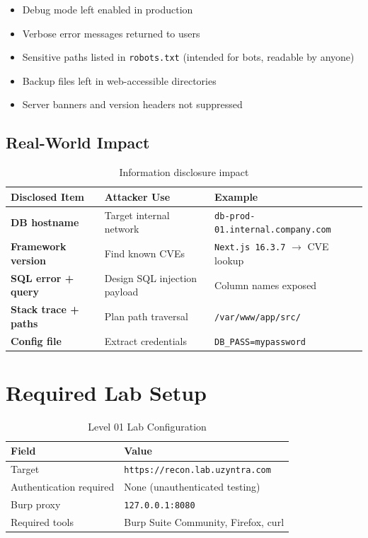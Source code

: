 \begin{itemize}
  \item Debug mode left enabled in production
  \item Verbose error messages returned to users
  \item Sensitive paths listed in \texttt{robots.txt} (intended for bots, readable by anyone)
  \item Backup files left in web-accessible directories
  \item Server banners and version headers not suppressed
\end{itemize}

\subsection{Real-World Impact}

\begin{table}[H]
\centering
\caption{Information disclosure impact}
\begin{tabularx}{\textwidth}{>{\bfseries}lXl}
\toprule
Disclosed Item & Attacker Use & Example \\
\midrule
DB hostname & Target internal network & \texttt{db-prod-01.internal.company.com} \\
Framework version & Find known CVEs & \texttt{Next.js 16.3.7} $\to$ CVE lookup \\
SQL error + query & Design SQL injection payload & Column names exposed \\
Stack trace + paths & Plan path traversal & \texttt{/var/www/app/src/} \\
Config file & Extract credentials & \texttt{DB\_PASS=mypassword} \\
\bottomrule
\end{tabularx}
\end{table}

\section{Required Lab Setup}

\begin{table}[H]
\centering
\caption{Level 01 Lab Configuration}
\begin{tabular}{ll}
\toprule
Field & Value \\
\midrule
Target & \texttt{https://recon.lab.uzyntra.com} \\
Authentication required & None (unauthenticated testing) \\
Burp proxy & \texttt{127.0.0.1:8080} \\
Required tools & Burp Suite Community, Firefox, curl \\
\bottomrule
\end{tabular}
\end{table}

